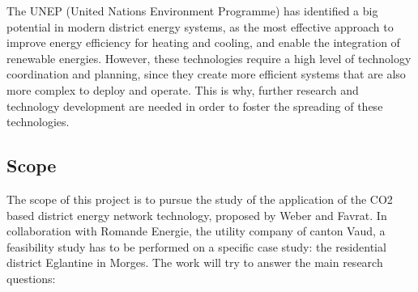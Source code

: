 \documentclass{article}
\begin{document}
The UNEP (United Nations Environment Programme) has identified a big potential in modern district energy systems, as the most effective approach to improve energy efficiency for heating and cooling, and enable the integration of renewable energies. However, these technologies require a high level of technology coordination and planning, since they create more efficient systems that are also more complex to deploy and operate. This is why, further research and technology development are needed in order to foster the spreading of these technologies.



\subsection{Scope}
The scope of this project is to pursue the study of the application of the CO2 based district energy network technology, proposed by Weber and Favrat\cite{weberConventionalAdvancedCO22010a}. In collaboration with Romande Energie, the utility company of canton Vaud, a feasibility study has to be performed on a specific case study: the residential district Eglantine in Morges. The work will try to answer the main research questions:\\
\end{document}
